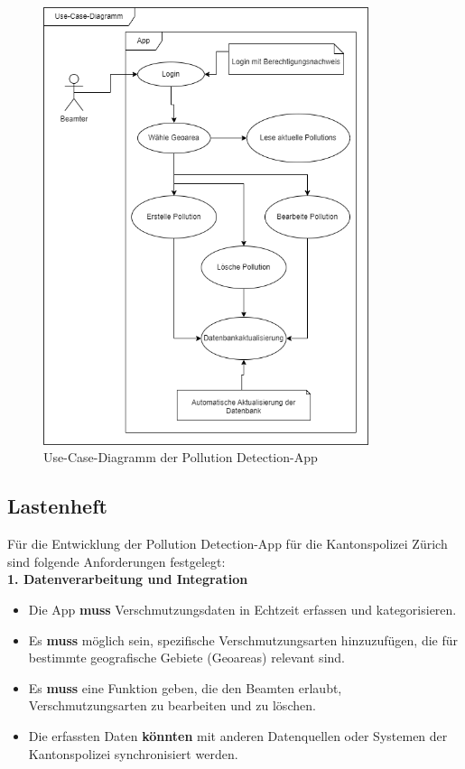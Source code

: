 \documentclass[a4paper,12pt]{article}
\begin{document}
\begin{figure}[h]
\centering
\includegraphics[width=0.85\textwidth]{bilder/use-case-diagramm.drawio.png}
\caption{Use-Case-Diagramm der \glqq Pollution Detection\grqq{}-App}
\end{figure}

\clearpage
\subsection{Lastenheft}
\label{sec:lastenheft}

Für die Entwicklung der \glqq Pollution Detection\grqq{}-App für die Kantonspolizei Zürich sind folgende Anforderungen festgelegt:\\

\noindent\textbf{1. Datenverarbeitung und Integration}

\begin{itemize}
    \item Die App \textbf{muss} Verschmutzungsdaten in Echtzeit erfassen und kategorisieren.
    \item Es \textbf{muss} möglich sein, spezifische Verschmutzungsarten hinzuzufügen, die für bestimmte geografische Gebiete (Geoareas) relevant sind.
    \item Es \textbf{muss} eine Funktion geben, die den Beamten erlaubt, Verschmutzungsarten zu bearbeiten und zu löschen.
    \item Die erfassten Daten \textbf{könnten} mit anderen Datenquellen oder Systemen der Kantonspolizei synchronisiert werden.
\end{itemize}
\end{document}

